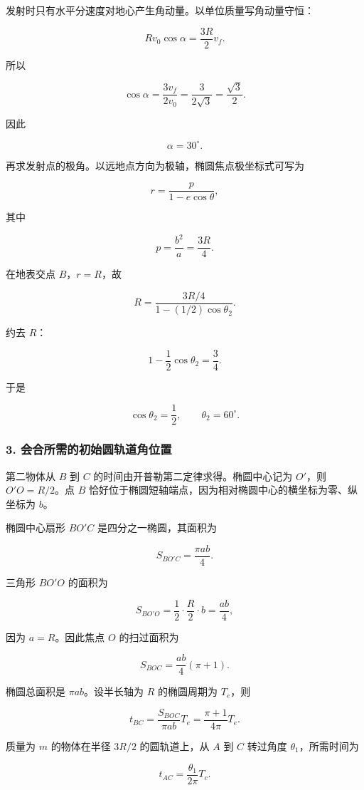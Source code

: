 \documentclass[12pt,a4paper,UTF8]{ctexart}
\begin{document}
发射时只有水平分速度对地心产生角动量。以单位质量写角动量守恒：

\[
Rv_0\cos\alpha=\frac{3R}{2}v_f.
\]

所以

\[
\cos\alpha
=\frac{3v_f}{2v_0}
=\frac{3}{2\sqrt3}
=\frac{\sqrt3}{2}.
\]

因此

\[
\boxed{\alpha=30^\circ}.
\]

再求发射点的极角。以远地点方向为极轴，椭圆焦点极坐标式可写为

\[
r=\frac{p}{1-e\cos\theta},
\]

其中

\[
p=\frac{b^2}{a}=\frac{3R}{4}.
\]

在地表交点 \(B\)，\(r=R\)，故

\[
R=\frac{3R/4}{1-(1/2)\cos\theta_2}.
\]

约去 \(R\)：

\[
1-\frac12\cos\theta_2=\frac34.
\]

于是

\[
\cos\theta_2=\frac12,
\qquad
\boxed{\theta_2=60^\circ}.
\]

\subsubsection{3.
会合所需的初始圆轨道角位置}\label{ux4f1aux5408ux6240ux9700ux7684ux521dux59cbux5706ux8f68ux9053ux89d2ux4f4dux7f6e}

第二物体从 \(B\) 到 \(C\) 的时间由开普勒第二定律求得。椭圆中心记为
\(O'\)，则 \(O'O=R/2\)。点 \(B\)
恰好位于椭圆短轴端点，因为相对椭圆中心的横坐标为零、纵坐标为 \(b\)。

椭圆中心扇形 \(BO'C\) 是四分之一椭圆，其面积为

\[
S_{BO'C}=\frac{\pi ab}{4}.
\]

三角形 \(BO'O\) 的面积为

\[
S_{BO'O}=\frac12\cdot\frac{R}{2}\cdot b
=\frac{ab}{4},
\]

因为 \(a=R\)。因此焦点 \(O\) 的扫过面积为

\[
S_{BOC}=\frac{ab}{4}(\pi+1).
\]

椭圆总面积是 \(\pi ab\)。设半长轴为 \(R\) 的椭圆周期为 \(T_e\)，则

\[
t_{BC}=\frac{S_{BOC}}{\pi ab}T_e
=\frac{\pi+1}{4\pi}T_e.
\]

质量为 \(m\) 的物体在半径 \(3R/2\) 的圆轨道上，从 \(A\) 到 \(C\)
转过角度 \(\theta_1\)，所需时间为

\[
t_{AC}=\frac{\theta_1}{2\pi}T_c.
\]
\end{document}

